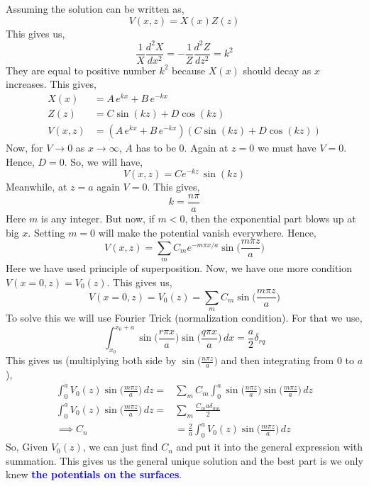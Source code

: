 \documentclass{article}
\begin{document}
Assuming the solution can be written as,
\begin{equation}
    V(x,z) = X(x) Z(z)
\end{equation}
This gives us,
\begin{equation}
    \frac{1}{X}\frac{d^2 X}{dx^2} =  -\frac{1}{Z}\frac{d^2 Z}{dz^2} = k^2
\end{equation}
They are equal to positive number $k^2$ because $X(x)$ should decay as $x$ increases. This gives,
\begin{equation}
    \begin{split}
        X(x) &= A\, e^{kx}+ B\, e^{-kx}\\
        Z(z) &= C \sin(k z)+ D \cos(k z)\\
        V(x,z) &= (A\, e^{kx}+ B\, e^{-kx})(C \sin(k z)+ D \cos(k z))
    \end{split}
\end{equation}
Now, for $V\to 0$ as $x\to \infty$, $A$ has to be $0$. Again at $z=0$ we must have $V=0$. Hence, $D=0$. So, we will have,
\begin{equation}
    V(x,z) = C e^{-kz} \, \sin(kz)
\end{equation}
Meanwhile, at $z=a$ again $V=0$. This gives,
\begin{equation}
    k = \frac{n\pi}{a}
\end{equation}
Here $m$ is any integer. But now, if $m<0$, then the exponential part blows up at big $x$. Setting $m=0$ will make the potential vanish everywhere. Hence, 
\begin{equation}
    V(x,z) = \sum_m C_m e^{-m\pi x/a} \sin\Big(\frac{m\pi z}{a}\Big)
\end{equation}
Here we have used principle of superposition. Now, we have one more condition $V(x=0,z)=V_0(z)$. This gives us,
\begin{equation}
    V(x=0,z) = V_0(z) = \sum_m C_m \sin\Big(\frac{m\pi z}{a}\Big)
\end{equation}
To solve this we will use Fourier Trick (normalization condition). For that we use,
\begin{equation}
    \int_{x_0}^{x_0+a}\sin \Big(\frac{r \pi x}{a}\Big)\sin\Big(\frac{q \pi x}{a}\Big) \, dx = \frac{a}{2}\delta_{rq}
    \label{fourier_sins}
\end{equation}
This gives us (multiplying both side by $\sin\Big(\frac{n\pi z}{a}\Big)$ and then integrating from $0$ to $a$),
\begin{equation}
    \begin{split}
            \int_0^a V_0(z) \sin\Big(\frac{m\pi z}{a}\Big)\, dz =& \sum_m C_m\int_{0}^{a}\sin \Big(\frac{n \pi z}{a}\Big)\sin\Big(\frac{m \pi z}{a}\Big) \, dz\\
        \int_0^a V_0(z) \sin\Big(\frac{m\pi z}{a}\Big)\, dz =& \sum_m \frac{C_m a \delta_{mn}}{2}\\
       \implies  C_n &= \frac{2}{a}\int_0^a V_0(z) \sin\Big(\frac{m\pi z}{a}\Big)\, dz
    \end{split}
\end{equation}
So, Given $V_0(z)$, we can just find $C_n$ and put it into the general expression with summation. This gives us the general unique solution and the best part is we only knew \textbf{\textcolor{blue}{the potentials on the surfaces}}.
\end{document}
